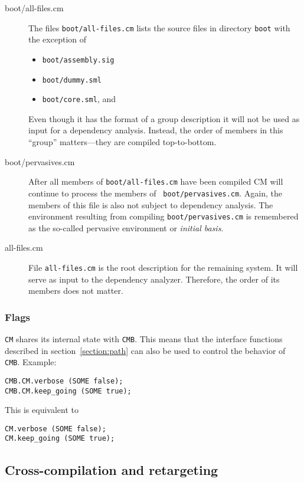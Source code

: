 \documentclass{article}
\begin{document}
\begin{description}
\item[boot/all-files.cm] The files {\tt boot/all-files.cm} lists the
source files in directory {\tt boot} with the exception of
\begin{itemize}
\item {\tt boot/assembly.sig}
\item {\tt boot/dummy.sml}
\item {\tt boot/core.sml}, and
\end{itemize}
Even though it has the format of a group description it will not be
used as input for a dependency analysis.  Instead, the order of
members in this ``group'' matters---they are compiled top-to-bottom.
\item[boot/pervasives.cm] After all members of {\tt boot/all-files.cm}
have been compiled CM will continue to process the members of {\tt
boot/pervasives.cm}.  Again, the members of this file is also not
subject to dependency analysis.  The environment resulting from
compiling {\tt boot/pervasives.cm} is remembered as the so-called
pervasive environment or {\em initial basis}.
\item[all-files.cm] File {\tt all-files.cm} is the root description
for the remaining system.  It will serve as input to the dependency
analyzer.  Therefore, the order of its members does not matter.
\end{description}

\subsubsection{Flags}

{\tt CM} shares its internal state with {\tt CMB}.  This means that
the interface functions described in section~\ref{section:path} can
also be used to control the behavior of {\tt CMB}. Example:

\begin{verbatim}
CMB.CM.verbose (SOME false);
CMB.CM.keep_going (SOME true);
\end{verbatim}

This is equivalent to

\begin{verbatim}
CM.verbose (SOME false);
CM.keep_going (SOME true);
\end{verbatim}

\subsection{Cross-compilation and retargeting}
\end{document}
